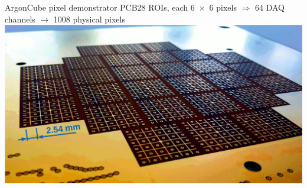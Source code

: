 \documentclass[]{beamer}
\newcommand*{\emphcoltitle}{blue}
\newcommand*{\AC}{{ArgonCube}}
\begin{document}
\begin{frame}{\AC{} pixel demonstrator PCB}{\num{28} ROIs, each \num{6 x 6} pixels $\Rightarrow$ {\color{\emphcoltitle} \num{64} DAQ channels $\rightarrow$ \num{1008} physical pixels}}
	\centering
	\includegraphics[width=\textwidth]{viper/pixies}
\end{frame}
\end{document}
